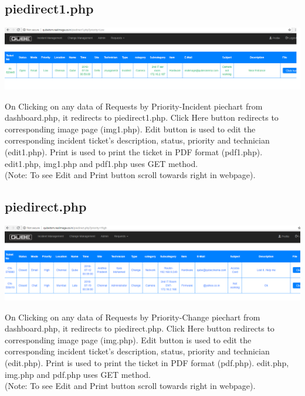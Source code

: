 \documentclass{article}
\begin{document}
\subsection{piedirect1.php}
\begin{center}

    \includegraphics[width=7.0in]{piedirect1.png}
   
    \label{}

\end{center}
On Clicking on any data of Requests by Priority-Incident piechart from dashboard.php, it redirects to piedirect1.php. Click Here button redirects to corresponding image page \big(img1.php\big). Edit button is used to edit the corresponding incident ticket's description, status, priority and technician \big(edit1.php\big). Print is used to print the ticket in PDF format \big(pdf1.php\big). edit1.php, img1.php and pdf1.php uses GET method.\\
\big(Note: To see Edit and Print button scroll towards right in webpage\big).

\subsection{piedirect.php}
\begin{center}

    \includegraphics[width=7.0in]{piedirect.png}
   
    \label{}

\end{center}
On Clicking on any data of Requests by Priority-Change piechart from dashboard.php, it redirects to piedirect.php. Click Here button redirects to corresponding image page \big(img.php\big). Edit button is used to edit the corresponding incident ticket's description, status, priority and technician \big(edit.php\big). Print is used to print the ticket in PDF format \big(pdf.php\big). edit.php, img.php and pdf.php uses GET method.\\
\big(Note: To see Edit and Print button scroll towards right in webpage\big).
\end{document}

